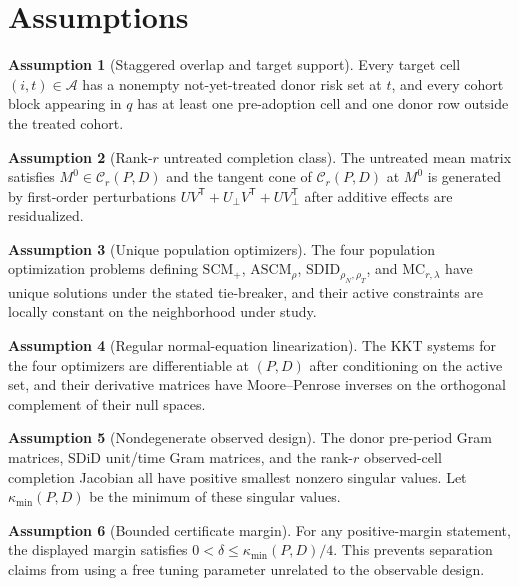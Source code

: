 \documentclass[11pt]{article}
\newcommand{\transpose}{\mathsf{T}}
\theoremstyle{definition}
\newtheorem{assumption}{Assumption}
\theoremstyle{plain}
\theoremstyle{remark}
\begin{document}
\section{Assumptions}
\begin{assumption}[Staggered overlap and target support]\label{ass:overlap}
Every target cell $(i,t)\in\mathcal A$ has a nonempty not-yet-treated donor
risk set at $t$, and every cohort block appearing in $q$ has at least one
pre-adoption cell and one donor row outside the treated cohort.
\end{assumption}

\begin{assumption}[Rank-$r$ untreated completion class]\label{ass:rank}
The untreated mean matrix satisfies $M^0\in\mathcal C_r(P,D)$ and the tangent
cone of $\mathcal C_r(P,D)$ at $M^0$ is generated by first-order perturbations
$UV^\transpose+U_\perp V^\transpose+UV_\perp^\transpose$ after additive effects
are residualized.
\end{assumption}

\begin{assumption}[Unique population optimizers]\label{ass:unique}
The four population optimization problems defining
$\mathrm{SCM}_{+}$, $\mathrm{ASCM}_{\rho}$,
$\mathrm{SDID}_{\rho_N,\rho_T}$, and $\mathrm{MC}_{r,\lambda}$ have unique
solutions under the stated tie-breaker, and their active constraints are
locally constant on the neighborhood under study.
\end{assumption}

\begin{assumption}[Regular normal-equation linearization]\label{ass:linear}
The KKT systems for the four optimizers are differentiable at $(P,D)$ after
conditioning on the active set, and their derivative matrices have Moore--Penrose
inverses on the orthogonal complement of their null spaces.
\end{assumption}

\begin{assumption}[Nondegenerate observed design]\label{ass:nongenerate}
The donor pre-period Gram matrices, SDiD unit/time Gram matrices, and the
rank-$r$ observed-cell completion Jacobian all have positive smallest
nonzero singular values. Let $\kappa_{\min}(P,D)$ be the minimum of these
singular values.
\end{assumption}

\begin{assumption}[Bounded certificate margin]\label{ass:margin}
For any positive-margin statement, the displayed margin satisfies
$0<\delta\le \kappa_{\min}(P,D)/4$. This prevents separation claims from
using a free tuning parameter unrelated to the observable design.
\end{assumption}
\end{document}
